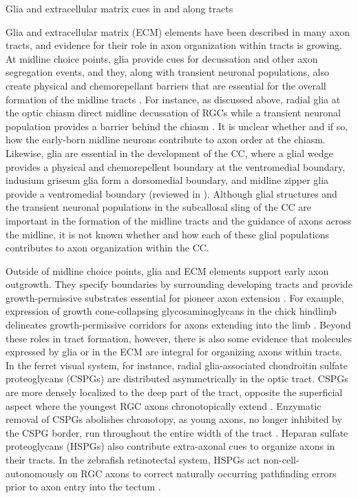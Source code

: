 Glia and extracellular matrix cues in and along tracts

Glia and extracellular matrix (ECM) elements have been described in many axon tracts, and evidence for their role in axon organization within tracts is growing. 
At midline choice points, glia provide cues for decussation and other axon segregation events, and they, along with transient neuronal populations, also create physical and chemorepellant barriers that are essential for the overall formation of the midline tracts \cite{raper2010cellular,suarez2014evolution}. 
For instance, as discussed above, radial glia at the optic chiasm direct midline decussation of RGCs while a transient neuronal population provides a barrier behind the chiasm \cite{raper2010cellular,petros2008retinal}. 
It is unclear whether and if so, how the early-born midline neurons contribute to axon order at the chiasm. 
Likewise, glia are essential in the development of the CC, where a glial wedge provides a physical and chemorepellent boundary at the ventromedial boundary, indusium griseum glia form a dorsomedial boundary, and midline zipper glia provide a ventromedial boundary (reviewed in \cite{suarez2014evolution}). 
Although glial structures and the transient neuronal populations in the subcallosal sling of the CC are important in the formation of the midline tracts and the guidance of axons across the midline, it is not known whether and how each of these glial populations contributes to axon organization within the CC. 

Outside of midline choice points, glia and ECM elements support early axon outgrowth. 
They specify boundaries by surrounding developing tracts \cite{marcus1995expression} and provide growth-permissive substrates essential for pioneer axon extension \cite{raper2010cellular}. 
For example, expression of growth cone-collapsing glycosaminoglycans in the chick hindlimb delineates growth-permissive corridors for axons extending into the limb \cite{tosney1985development}. 
Beyond these roles in tract formation, however, there is also some evidence that molecules expressed by glia or in the ECM are integral for organizing axons within tracts. 
In the ferret visual system, for instance, radial glia-associated chondroitin sulfate proteoglycans (CSPGs) are distributed asymmetrically in the optic tract. 
CSPGs are more densely localized to the deep part of the tract, opposite the superficial aspect where the youngest RGC axons chronotopically extend \cite{reese1997chronotopic}. 
Enzymatic removal of CSPGs abolishes chronotopy, as young axons, no longer inhibited by the CSPG border, run throughout the entire width of the tract \cite{leung2003enzymatic}. 
Heparan sulfate proteoglycans (HSPGs) also contribute extra-axonal cues to organize axons in their tracts. 
In the zebrafish retinotectal system, HSPGs act non-cell-autonomously on RGC axons to correct naturally occurring pathfinding errors prior to axon entry into the tectum \cite{poulain2013proteoglycan}. 

